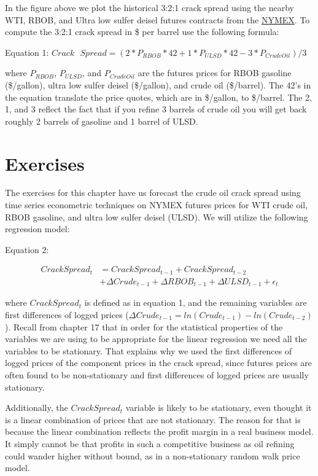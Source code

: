 \documentclass[
  letterpaper,
  DIV=11,
  numbers=noendperiod]{scrreprt}
\begin{document}
In the figure above we plot the historical 3:2:1 crack spread using the
nearby WTI, RBOB, and Ultra low sulfer deisel futures contracts from the
\href{www.NYMEX.com}{NYMEX}. To compute the 3:2:1 crack spread in \$ per
barrel use the following formula:

Equation 1:
\(Crack \text{ } Spread = (2*P_{RBOB}*42 + 1*P_{ULSD}*42 - 3*P_{CrudeOil})/3\)

where \(P_{RBOB}\), \(P_{ULSD}\), and \(P_{CrudeOil}\) are the futures
prices for RBOB gasoline (\$/gallon), ultra low sulfer deisel
(\$/gallon), and crude oil (\$/barrel). The 42's in the equation
translate the price quotes, which are in \$/gallon, to \$/barrel. The 2,
1, and 3 reflect the fact that if you refine 3 barrels of crude oil you
will get back roughly 2 barrels of gasoline and 1 barrel of ULSD.

\hypertarget{exercises-8}{%
\section{Exercises}\label{exercises-8}}

The exercises for this chapter have us forecast the crude oil crack
spread using time series econometric techniques on NYMEX futures prices
for WTI crude oil, RBOB gasoline, and ultra low sulfer deisel (ULSD). We
will utilize the following regression model:

Equation 2:

\begin{align}
Crack Spread_t &= Crack Spread_{t-1} + Crack Spread_{t-2}    \\
                  & + \Delta Crude_{t-1} + \Delta RBOB_{t-1} + \Delta ULSD_{t-1} + \epsilon_t
\end{align}

where \(Crack Spread_t\) is defined as in equation 1, and the remaining
variables are first differences of logged prices
(\(\Delta Crude_{t-1} = ln(Crude_{t-1}) - ln(Crude_{t-2})\)). Recall
from chapter 17 that in order for the statistical properties of the
variables we are using to be appropriate for the linear regression we
need all the variables to be stationary. That explains why we used the
first differences of logged prices of the component prices in the crack
spread, since futures prices are often found to be non-stationary and
first differences of logged prices are usually stationary.

Additionally, the \(Crack Spread_t\) variable is likely to be
stationary, even thought it is a linear combination of prices that are
not stationary. The reason for that is because the linear combination
reflects the profit margin in a real business model. It simply cannot be
that profits in such a competitive business as oil refining could wander
higher without bound, as in a non-stationary random walk price model.
\end{document}
